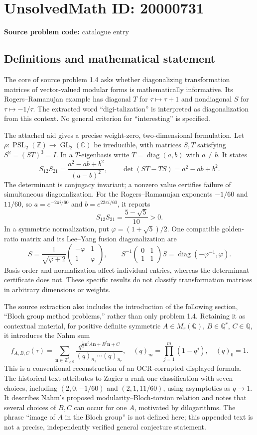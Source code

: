 \documentclass[11pt]{article}
\newcommand{\Z}{\mathbb{Z}}
\newcommand{\Q}{\mathbb{Q}}
\newcommand{\C}{\mathbb{C}}
\begin{document}
\section*{UnsolvedMath ID: 20000731}
\textbf{Source problem code:} catalogue entry
\subsection{Definitions and mathematical statement}
The core of source problem 1.4 asks whether diagonalizing transformation matrices of vector-valued modular forms is mathematically informative. Its Rogers--Ramanujan example has diagonal $T$ for $\tau\mapsto\tau+1$ and nondiagonal $S$ for $\tau\mapsto-1/\tau$. The extracted word ``digi-talization'' is interpreted as diagonalization from this context. No general criterion for ``interesting'' is specified.

The attached aid gives a precise weight-zero, two-dimensional formulation. Let $\rho:\operatorname{PSL}_2(\Z)\to\operatorname{GL}_2(\C)$ be irreducible, with matrices $S,T$ satisfying $S^2=(ST)^3=I$. In a $T$-eigenbasis write $T=\operatorname{diag}(a,b)$ with $a\ne b$. It states
\[
S_{12}S_{21}=\frac{a^2-ab+b^2}{(a-b)^2},\qquad
\det(ST-TS)=a^2-ab+b^2.
\]
The determinant is conjugacy invariant; a nonzero value certifies failure of simultaneous diagonalization. For the Rogers--Ramanujan exponents $-1/60$ and $11/60$, so $a=e^{-2\pi i/60}$ and $b=e^{22\pi i/60}$, it reports
\[
S_{12}S_{21}=\frac{5-\sqrt5}{10}>0.
\]
In a symmetric normalization, put $\varphi=(1+\sqrt5)/2$. One compatible golden-ratio matrix and its Lee--Yang fusion diagonalization are
\[
S=\frac1{\sqrt{\varphi+2}}\begin{pmatrix}-\varphi&1\\1&\varphi\end{pmatrix},\qquad
S^{-1}\begin{pmatrix}0&1\\1&1\end{pmatrix}S
=\operatorname{diag}(-\varphi^{-1},\varphi).
\]
Basis order and normalization affect individual entries, whereas the determinant certificate does not. These specific results do not classify transformation matrices in arbitrary dimensions or weights.

The source extraction also includes the introduction of the following section, ``Bloch group method problems,'' rather than only problem 1.4. Retaining it as contextual material, for positive definite symmetric $A\in M_r(\Q)$, $B\in\Q^r$, $C\in\Q$, it introduces the Nahm sum
\[
f_{A,B,C}(\tau)=\sum_{\mathbf n\in\Z_{\ge0}^r}\frac{q^{\frac12\mathbf n^t A\mathbf n+B^t\mathbf n+C}}{(q)_{n_1}\cdots(q)_{n_r}},\quad
(q)_m=\prod_{j=1}^m(1-q^j),\quad(q)_0=1.
\]
This is a conventional reconstruction of an OCR-corrupted displayed formula. The historical text attributes to Zagier a rank-one classification with seven choices, including $(2,0,-1/60)$ and $(2,1,11/60)$, using asymptotics as $q\to1$. It describes Nahm's proposed modularity--Bloch-torsion relation and notes that several choices of $B,C$ can occur for one $A$, motivated by dilogarithms. The phrase ``image of $A$ in the Bloch group'' is not defined here; this appended text is not a precise, independently verified general conjecture statement.
\end{document}
